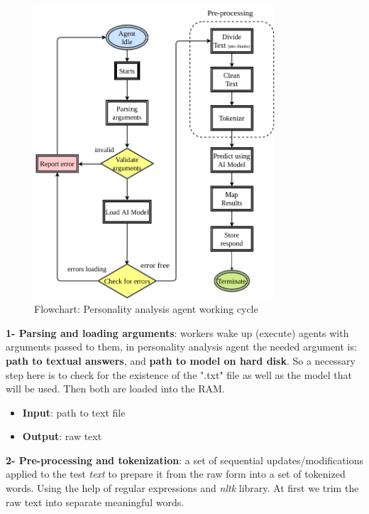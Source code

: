 \begin{figure}[h!]
\centering
\includegraphics[width=0.8\textwidth]{images/personality_flow.png}
\caption{Flowchart: Personality analysis agent working cycle}
\label{fig:personality_flow}
\end{figure}

\textbf{1- Parsing and loading arguments}: workers wake up (execute) agents with arguments passed to them, in personality analysis agent the needed argument is: \textbf{path to textual answers}, and \textbf{path to model on hard disk}. So a necessary step here is to check for the existence of the ".txt" file as well as the model that will be used. Then both are loaded into the RAM.

\begin{itemize}
    \item \textbf{Input}: path to text file
    \item \textbf{Output}: raw text\\
\end{itemize}




\textbf{2- Pre-processing and tokenization}: a set of sequential updates/modifications applied to the test \textit{text} to prepare it from the raw form into a set of tokenized words. Using the help of regular expressions and \textit{nltk} library. At first we trim the raw text into separate meaningful words.

